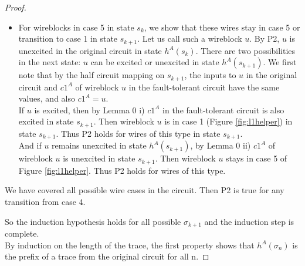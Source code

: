 \documentclass[12pt]{report}
\begin{document}
\begin{proof}
\begin{itemize}
\begin{itemize}
\item
For wireblocks in case 5 in state $s_k$, we show that these wires stay in case 5 or transition to case 1 in state $s_{k+1}$.  Let us call such a wireblock $u$.  By P2, $u$ is unexcited in the original circuit in state $h^A(s_{k})$.  There are two possibilities in the next state: $u$ can be excited or unexcited in state $h^A(s_{k+1})$.  We first note that by the half circuit mapping on $s_{k+1}$, the inputs to $u$ in the original circuit and $c1^A$ of wireblock $u$ in the fault-tolerant circuit have the same values, and also $c1^A=u$.  \\
If $u$ is excited, then by Lemma 0 i) $c1^A$ in the fault-tolerant circuit is also excited in state $s_{k+1}$.  Then wireblock $u$ is in case 1 (Figure \ref{fig:l1helper}) in state $s_{k+1}$.  Thus P2 holds for wires of this type in state $s_{k+1}$.\\
And if $u$ remains unexcited in state $h^A(s_{k+1})$, by Lemma 0 ii) $c1^A$ of wireblock $u$ is unexcited in state $s_{k+1}$.  Then wireblock $u$ stays in case 5 of Figure \ref{fig:l1helper}.  Thus P2 holds for wires of this type.
\end{itemize}
We have covered all possible wire cases in the circuit.   
Then P2 is true for any transition from case 4. 
\end{itemize}
So the induction hypothesis holds for all possible $\sigma_{k+1}$ and the induction step is complete. \\
By induction on the length of the trace, the first property shows that $h^{A}(\sigma_n)$ is the prefix of a trace from the original circuit for all n.


\end{proof}
\end{document}
